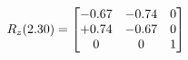 \documentclass[preview]{standalone}
\begin{document}
\begin{align*}
\special{dvisvgm:raw <g id='unique000'>}R_{z}(2.30) = \begin{bmatrix}-0.67 & -0.74 & 0 \\+0.74 & -0.67 & 0 \\0 & 0 & 1\end{bmatrix}\special{dvisvgm:raw </g>}
\end{align*}
\end{document}
